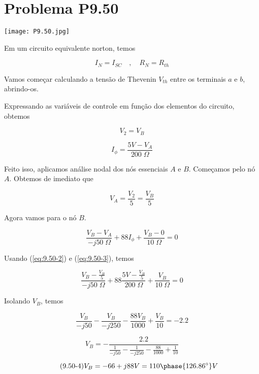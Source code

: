\section*{Problema P9.50}

\begin{center}
    \texttt{[image: P9.50.jpg]}
\end{center}


Em um circuito equivalente norton, temos

\[ I_N = I_{SC} \quad, \quad R_N = R_{th}  \]

Vamos começar calculando a tensão de Thevenin \(V_{th}\) entre os terminais \(a\) e \(b\), abrindo-os.

Expressando as variáveis de controle em função dos elementos do circuito, obtemos

\begin{equation}\label{eq:9.50-1}\tag{9.50-1}
    V_{2} = V_B
\end{equation}

\begin{equation}\label{eq:9.50-2}\tag{9.50-2}
    I_{\phi} = \frac{5V - V_A}{200 \;\Omega}
\end{equation}

Feito isso, aplicamos análise nodal dos nós essenciais \( A \) e \( B \).
Começamos pelo nó \( A \). Obtemos de imediato que

\begin{equation}\label{eq:9.50-3}\tag{9.50-3}
    V_{A} = \frac{V_2}{5} = \frac{V_B}{5}
\end{equation}

Agora vamos para o nó \( B \).

\[ \frac{V_B - V_A}{-j50 \;\Omega} + 88I_{\phi} + \frac{V_B - 0}{10 \;\Omega} = 0 \]

Usando (\ref{eq:9.50-2}) e (\ref{eq:9.50-3}), temos

\[ \frac{V_B - \frac{V_B}{5}}{-j50 \;\Omega} + 88\frac{5V - \frac{V_B}{5}}{200 \;\Omega} + \frac{V_B}{10 \;\Omega} = 0 \]

Isolando \( V_{B} \), temos

\[ \frac{V_B}{-j50} - \frac{V_B}{-j250} - \frac{88V_B}{1000} + \frac{V_B}{10} = - 2.2\]

\[ V_B = - \frac{2.2}{\frac{1}{-j50} - \frac{1}{-j250} - \frac{88}{1000} + \frac{1}{10}}\]

\begin{equation}\label{eq:9.50-4}\tag{9.50-4}
    V_{B} = - 66 + j88 V = 110\phase{126.86^{\circ}} V
\end{equation}

